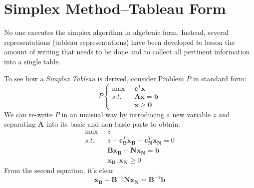 \section{Simplex Method--Tableau Form}
No one executes the simplex algorithm in algebraic form. Instead, several representations (tableau representations) have been developed to lesson the amount of writing that needs to be done and to collect all pertinent information into a single table. 

To see how a \textit{Simplex Tableau} is derived, consider Problem $P$ in standard form:
\begin{displaymath}P\left\{
\begin{aligned}
\max\;\;&\mathbf{c}^T\mathbf{x}\\
s.t.\;\;&\mathbf{A}\mathbf{x} = \mathbf{b}\\
& \mathbf{x} \geq \mathbf{0}
\end{aligned}\right.
\end{displaymath}
We can re-write $P$ in an unusual way by introducing a new variable $z$ and separating $\mathbf{A}$ into its basic and non-basic parts to obtain:
\begin{equation}
\begin{aligned}
\max\;\;&z\\
s.t.\;\; &z - \mathbf{c}_\mathbf{B}^T\mathbf{x_B} - \mathbf{c}_\mathbf{N}^T\mathbf{x_N} = 0\\ 
&\mathbf{B}\mathbf{x_B} + \mathbf{N}\mathbf{x_N} = \mathbf{b}\\
& \mathbf{x_B},\mathbf{x_N} \geq 0
\end{aligned}
\end{equation}
From the second equation, it's clear 
\begin{equation}
\mathbf{x_B} + \mathbf{B}^{-1}\mathbf{N}\mathbf{x_N} = \mathbf{B}^{-1}\mathbf{b}
\label{eqn:Row2}
\end{equation}

